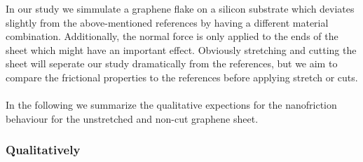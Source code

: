 In our study we simmulate a graphene flake on a silicon substrate which deviates slightly from the above-mentioned references by having a different material combination. Additionally, the normal force is only applied to the ends of the sheet which might have an important effect. Obviously stretching and cutting the sheet will seperate our study dramatically from the references, but we aim to compare the frictional properties to the references before applying stretch or cuts. 
\\
\\
In the following we summarize the qualitative expections for the nanofriction behaviour for the unstretched and non-cut graphene sheet.
\subsubsection{Qualitatively}
